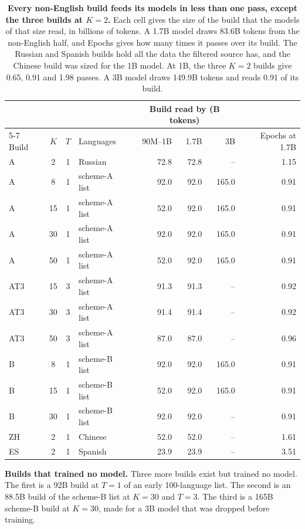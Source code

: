 \begin{table}[t]
\centering
\small
\setlength{\tabcolsep}{4pt}
\begin{tabular*}{\textwidth}{@{\extracolsep{\fill}}lcclrrrr@{}}
\toprule
 & & & & \multicolumn{3}{c}{Build read by (B tokens)} & \\
\cmidrule(lr){5-7}
Build & $K$ & $T$ & Languages & 90M--1B & 1.7B & 3B & Epochs at 1.7B \\
\midrule
A & 2 & 1 & Russian & 72.8 & 72.8 & -- & 1.15 \\
A & 8 & 1 & scheme-A list & 92.0 & 92.0 & 165.0 & 0.91 \\
A & 15 & 1 & scheme-A list & 52.0 & 92.0 & 165.0 & 0.91 \\
A & 30 & 1 & scheme-A list & 92.0 & 92.0 & 165.0 & 0.91 \\
A & 50 & 1 & scheme-A list & 52.0 & 92.0 & 165.0 & 0.91 \\
AT3 & 15 & 3 & scheme-A list & 91.3 & 91.3 & -- & 0.92 \\
AT3 & 30 & 3 & scheme-A list & 91.4 & 91.4 & -- & 0.92 \\
AT3 & 50 & 3 & scheme-A list & 87.0 & 87.0 & -- & 0.96 \\
B & 8 & 1 & scheme-B list & 92.0 & 92.0 & 165.0 & 0.91 \\
B & 15 & 1 & scheme-B list & 52.0 & 92.0 & 165.0 & 0.91 \\
B & 30 & 1 & scheme-B list & 92.0 & 92.0 & -- & 0.91 \\
ZH & 2 & 1 & Chinese & 52.0 & 52.0 & -- & 1.61 \\
ES & 2 & 1 & Spanish & 23.9 & 23.9 & -- & 3.51 \\
\bottomrule
\end{tabular*}
\caption{\textbf{Every non-English build feeds its models in less than one pass, except the three builds at $K=2$.} Each cell gives the size of the build that the models of that size read, in billions of tokens. A 1.7B model draws 83.6B tokens from the non-English half, and Epochs gives how many times it passes over its build. The Russian and Spanish builds hold all the data the filtered source has, and the Chinese build was sized for the 1B model. At 1B, the three $K=2$ builds give 0.65, 0.91 and 1.98 passes. A 3B model draws 149.9B tokens and reads 0.91 of its build.}
\label{tab:dcard-sizes}
\end{table}

\textbf{Builds that trained no model.} Three more builds exist but trained no model. The first is a 92B build at $T=1$ of an early 100-language list. The second is an 88.5B build of the scheme-B list at $K=30$ and $T=3$. The third is a 165B scheme-B build at $K=30$, made for a 3B model that was dropped before training.

